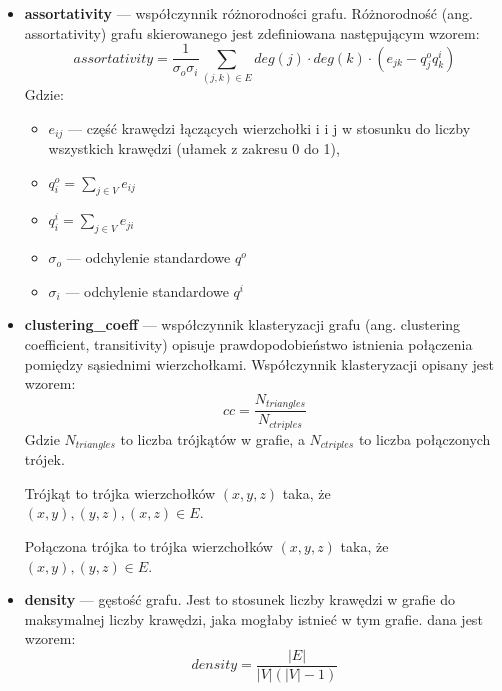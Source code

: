 \begin{itemize}
      \item \textbf{assortativity} --- współczynnik różnorodności grafu.  Różnorodność (ang. assortativity) grafu skierowanego jest zdefiniowana następującym wzorem:
            \begin{equation}
                  \label{eq:assortativity}
                  assortativity = \frac{1}{\sigma_o \sigma_i} \sum_{(j,k)\in{E}} deg(j) \cdot deg(k) \cdot (e_{jk} - q_j^o q_k^i)
            \end{equation}
            Gdzie:
            \begin{itemize}
                  \item $e_{ij}$ --- część krawędzi łączących wierzchołki i i j w stosunku do liczby wszystkich krawędzi (ułamek z zakresu 0 do 1),
                  \item $q_i^o = \sum_{j \in V} e_{ij}$
                  \item $q_i^i = \sum_{j \in V} e_{ji}$
                  \item $\sigma_o$ --- odchylenie standardowe $q^o$
                  \item $\sigma_i$ --- odchylenie standardowe $q^i$
            \end{itemize}
      \item \textbf{clustering\_coeff} --- współczynnik klasteryzacji grafu (ang. clustering coefficient, transitivity) opisuje prawdopodobieństwo istnienia połączenia pomiędzy sąsiednimi wierzchołkami.
            Współczynnik klasteryzacji opisany jest wzorem:
            $$cc = \frac{N_{triangles}}{N_{ctriples}}$$
            Gdzie $N_{triangles}$ to liczba trójkątów w grafie, a $N_{ctriples}$ to liczba połączonych trójek.

            Trójkąt to trójka wierzchołków $(x,y,z)$ taka, że $(x,y), (y,z), (x,z) \in E$.

            Połączona trójka to trójka wierzchołków $(x,y,z)$ taka, że $(x,y), (y,z) \in E$.

      \item \textbf{density} --- gęstość grafu. Jest to stosunek liczby krawędzi w grafie do maksymalnej liczby krawędzi, jaka mogłaby istnieć w tym grafie.
            dana jest wzorem:
            $$density = \frac{|E|}{|V|(|V|-1)}$$


\end{itemize}
